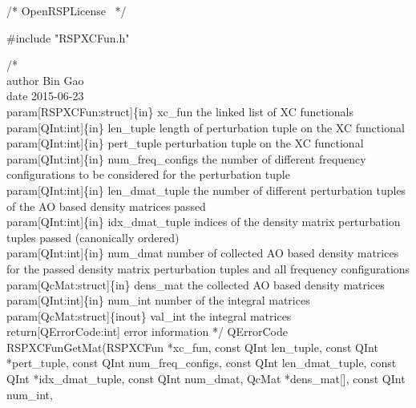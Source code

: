 \nwendcode{}\endmoddef
/*
  \LA{}OpenRSPLicense~{\nwtagstyle{}}\RA{}
*/

#include "RSPXCFun.h"

/*%
    \\author Bin Gao
    \\date 2015-06-23
    \\param[RSPXCFun:struct]\{in\} xc_fun the linked list of XC functionals
    \\param[QInt:int]\{in\} len_tuple length of perturbation tuple on the XC functional
    \\param[QInt:int]\{in\} pert_tuple perturbation tuple on the XC functional
    \\param[QInt:int]\{in\} num_freq_configs the number of different frequency
        configurations to be considered for the perturbation tuple
    \\param[QInt:int]\{in\} len_dmat_tuple the number of different perturbation
        tuples of the AO based density matrices passed
    \\param[QInt:int]\{in\} idx_dmat_tuple indices of the density matrix
        perturbation tuples passed (canonically ordered)
    \\param[QInt:int]\{in\} num_dmat number of collected AO based density matrices for
        the passed density matrix perturbation tuples and all frequency configurations
    \\param[QcMat:struct]\{in\} dens_mat the collected AO based density matrices
    \\param[QInt:int]\{in\} num_int number of the integral matrices
    \\param[QcMat:struct]\{inout\} val_int the integral matrices
    \\return[QErrorCode:int] error information
*/
QErrorCode RSPXCFunGetMat(RSPXCFun *xc_fun,
                          const QInt len_tuple,
                          const QInt *pert_tuple,
                          const QInt num_freq_configs,
                          const QInt len_dmat_tuple,
                          const QInt *idx_dmat_tuple,
                          const QInt num_dmat,
                          QcMat *dens_mat[],
                          const QInt num_int,
